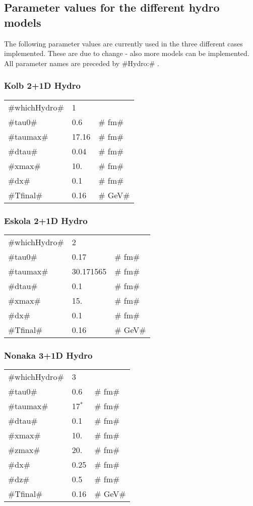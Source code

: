 \subsection{Parameter values for the different hydro models}
The following parameter values are currently used in the three different cases implemented. These are due to change - also more models can be implemented. All parameter names are preceded by #Hydro:# .
\subsubsection{Kolb 2+1D Hydro}
\label{kolbhydro}
\begin{tabular}{l l l}
   #whichHydro# & 1     &    ~  \\
   #tau0#       & 0.6   & # fm# \\
   #taumax#     & 17.16 & # fm# \\
   #dtau#       & 0.04  & # fm# \\
   #xmax#       & 10.   & # fm# \\
   #dx#         & 0.1   & # fm# \\
   #Tfinal#     & 0.16  & # GeV# 
\end{tabular}

\subsubsection{Eskola 2+1D Hydro}
\label{eskolahydro}
\begin{tabular}{l l l}
   #whichHydro# & 2         &    ~  \\
   #tau0#       & 0.17      & # fm# \\
   #taumax#     & 30.171565 & # fm# \\
   #dtau#       & 0.1       & # fm# \\
   #xmax#       & 15.       & # fm# \\
   #dx#         & 0.1       & # fm# \\
   #Tfinal#     & 0.16      & # GeV# 
\end{tabular}

\subsubsection{Nonaka 3+1D Hydro}
\label{nonakahydro}
\begin{tabular}{l l l}
   #whichHydro# & 3         &    ~  \\
   #tau0#       & 0.6       & # fm# \\
   #taumax#     & 17$^*$    & # fm# \\
   #dtau#       & 0.1       & # fm# \\
   #xmax#       & 10.       & # fm# \\
   #zmax#       & 20.       & # fm# \\
   #dx#         & 0.25      & # fm# \\
   #dz#         & 0.5       & # fm# \\
   #Tfinal#     & 0.16      & # GeV# 
\end{tabular}

